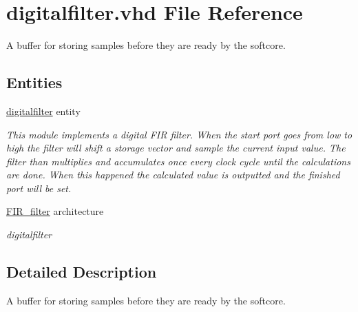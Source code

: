 \hypertarget{digitalfilter_8vhd}{\section{digitalfilter.\-vhd File Reference}
\label{digitalfilter_8vhd}
}


A buffer for storing samples before they are ready by the softcore.  


\subsection*{Entities}
\begin{DoxyCompactItemize}
\item 
\hyperlink{classdigitalfilter}{digitalfilter} entity
\begin{DoxyCompactList}\small\item\em This module implements a digital F\-I\-R filter. When the start port goes from low to high the filter will shift a storage vector and sample the current input value. The filter than multiplies and accumulates once every clock cycle until the calculations are done. When this happened the calculated value is outputted and the finished port will be set. \end{DoxyCompactList}\item 
\hyperlink{classdigitalfilter_1_1FIR__filter}{F\-I\-R\-\_\-filter} architecture
\begin{DoxyCompactList}\small\item\em digitalfilter \end{DoxyCompactList}\end{DoxyCompactItemize}


\subsection{Detailed Description}
A buffer for storing samples before they are ready by the softcore. 